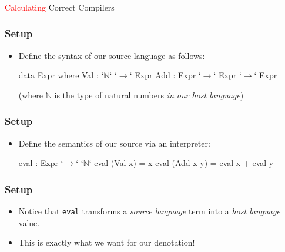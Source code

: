 \documentclass[usenames,dvipsnames]{beamer}
\newcommand{\N}{\mathbb{N}}
\begin{document}

\begin{frame}
  \frametitle{}

  \begin{center}
    \Huge \textcolor{red}{Calculating} Correct Compilers
  \end{center}
\end{frame}


\begin{frame}[fragile]
  \frametitle{Setup}

  \begin{itemize}
    \item Define the syntax of our source language as follows:

      \begin{code}
        data Expr where
          Val : `$\mathbb{N}$` `$\rightarrow$` Expr
          Add : Expr `$\rightarrow$` Expr `$\rightarrow$` Expr
      \end{code}

      (where $\N$ is the type of natural numbers \emph{in our host language})
  \end{itemize}
\end{frame}


\begin{frame}[fragile]
  \frametitle{Setup}

  \begin{itemize}
    \item Define the semantics of our source via an interpreter:

      \begin{code}
        eval : Expr `$\rightarrow$` `$\N$`
        eval (Val x) = x
        eval (Add x y) = eval x + eval y
      \end{code}
  \end{itemize}
\end{frame}


\begin{frame}
  \frametitle{Setup}

  \begin{itemize}
    \item Notice that \texttt{eval} transforms a \emph{source language} term
      into a \emph{host language} value.
    \item This is exactly what we want for our denotation!
  \end{itemize}
\end{frame}
\end{document}
